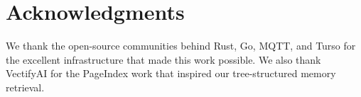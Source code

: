 \documentclass{article}
\begin{document}

\section*{Acknowledgments}

We thank the open-source communities behind Rust, Go, MQTT, and Turso for the excellent infrastructure that made this work possible. We also thank VectifyAI for the PageIndex work that inspired our tree-structured memory retrieval.





\end{document}
